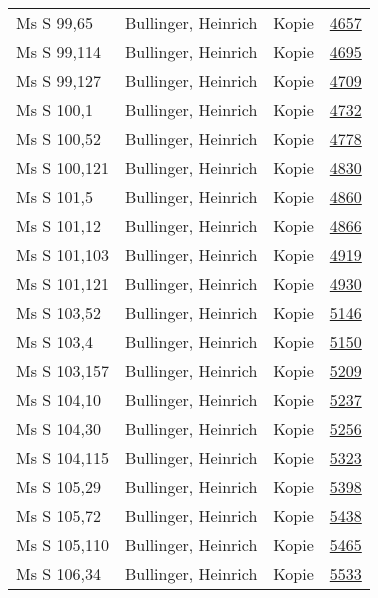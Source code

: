 \documentclass[10pt,a4paper,landscape]{report}
\begin{document}
\begin{longtable}{p{16cm}p{4cm}lr}
Ms S 99,65	&	Bullinger, Heinrich	&	Kopie	&	\href{http://130.60.24.72/assignment/4657}{4657}\\
Ms S 99,114	&	Bullinger, Heinrich	&	Kopie	&	\href{http://130.60.24.72/assignment/4695}{4695}\\
Ms S 99,127	&	Bullinger, Heinrich	&	Kopie	&	\href{http://130.60.24.72/assignment/4709}{4709}\\
Ms S 100,1	&	Bullinger, Heinrich	&	Kopie	&	\href{http://130.60.24.72/assignment/4732}{4732}\\
Ms S 100,52	&	Bullinger, Heinrich	&	Kopie	&	\href{http://130.60.24.72/assignment/4778}{4778}\\
Ms S 100,121	&	Bullinger, Heinrich	&	Kopie	&	\href{http://130.60.24.72/assignment/4830}{4830}\\
Ms S 101,5	&	Bullinger, Heinrich	&	Kopie	&	\href{http://130.60.24.72/assignment/4860}{4860}\\
Ms S 101,12	&	Bullinger, Heinrich	&	Kopie	&	\href{http://130.60.24.72/assignment/4866}{4866}\\
Ms S 101,103	&	Bullinger, Heinrich	&	Kopie	&	\href{http://130.60.24.72/assignment/4919}{4919}\\
Ms S 101,121	&	Bullinger, Heinrich	&	Kopie	&	\href{http://130.60.24.72/assignment/4930}{4930}\\
Ms S 103,52	&	Bullinger, Heinrich	&	Kopie	&	\href{http://130.60.24.72/assignment/5146}{5146}\\
Ms S 103,4	&	Bullinger, Heinrich	&	Kopie	&	\href{http://130.60.24.72/assignment/5150}{5150}\\
Ms S 103,157	&	Bullinger, Heinrich	&	Kopie	&	\href{http://130.60.24.72/assignment/5209}{5209}\\
Ms S 104,10	&	Bullinger, Heinrich	&	Kopie	&	\href{http://130.60.24.72/assignment/5237}{5237}\\
Ms S 104,30	&	Bullinger, Heinrich	&	Kopie	&	\href{http://130.60.24.72/assignment/5256}{5256}\\
Ms S 104,115	&	Bullinger, Heinrich	&	Kopie	&	\href{http://130.60.24.72/assignment/5323}{5323}\\
Ms S 105,29	&	Bullinger, Heinrich	&	Kopie	&	\href{http://130.60.24.72/assignment/5398}{5398}\\
Ms S 105,72	&	Bullinger, Heinrich	&	Kopie	&	\href{http://130.60.24.72/assignment/5438}{5438}\\
Ms S 105,110	&	Bullinger, Heinrich	&	Kopie	&	\href{http://130.60.24.72/assignment/5465}{5465}\\
Ms S 106,34	&	Bullinger, Heinrich	&	Kopie	&	\href{http://130.60.24.72/assignment/5533}{5533}\\

\end{longtable}
\end{document}
